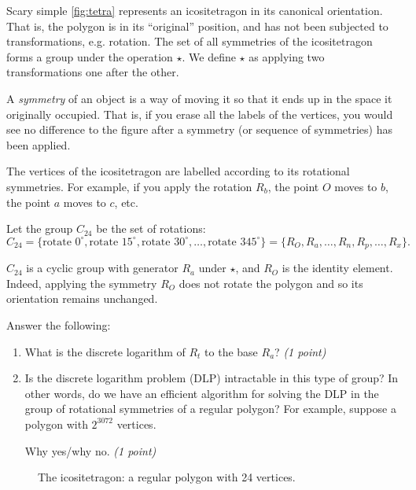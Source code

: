 \documentclass{homework}
\newcounter{ccount}
\def\nodeRot{0}
\newcommand*\poly[2][]{%
  \path (0,0) coordinate (C) [rotate/.append code={\def\nodeRot{##1}},#1]
  ++ ({angleForPoly(0,#2,0)}:x_radius and y_radius) coordinate[d] (c)
   \foreach \cnt[count=\Cnt from 0] in {1,...,#2} {
      (c) [late options={alias=c'}] (C)
      coordinate[d] (c) at ({angleForPoly(\cnt,#2,0)}:x_radius and y_radius)
      (c') edge[dashed] (c)
      \ifnum\Cnt>0 node[anchor={angleForPoly(\Cnt,#2,180+\nodeRot)},circle]
        {
          \setcounter{ccount}{\Cnt}
          \ifnum\Cnt>14\addtocounter{ccount}{1}\fi
          $\alph{ccount}$
        } \fi
   };}
\newcommand*{\polyname}{icositetragon}
\newcommand*{\polysides}{24}
\begin{document}
\begin{task}{Scary simple}
  \autoref{fig:tetra} represents an \polyname{} in its canonical orientation.
  That is, the polygon is in its \enquote{original} position, and has not been subjected to transformations, e.g. rotation.
  The set of all symmetries of the \polyname{} forms a group under the operation $\star$.
  We define $\star$ as applying two transformations one after the other.

  A \emph{symmetry} of an object is a way of moving it so that it ends up in the space it originally occupied.
  That is, if you erase all the labels of the vertices, you would see no difference to the figure after a symmetry (or sequence of symmetries) has been applied.

  The vertices of the \polyname{} are labelled according to its rotational symmetries.
  For example, if you apply the rotation $R_b$, the point $O$ moves to $b$, the point $a$ moves to $c$, etc.

  Let the group $C_{\polysides}$ be the set of rotations:
  \[
    C_{\polysides} = \{
      \text{rotate } 0^{\circ},
      \text{rotate } 15^{\circ},
      \text{rotate } 30^{\circ},
      \dots,
      \text{rotate } 345^{\circ}
    \} = \bigl\{R_O, R_a, \dots, R_n, R_p, \dots, R_x\bigr\}.
  \]

  $C_{\polysides}$ is a cyclic group with generator $R_a$ under $\star$, and $R_O$ is the identity element.
  Indeed, applying the symmetry $R_O$ does not rotate the polygon and so its orientation remains unchanged.

  Answer the following:
  \begin{enumerate}
    \item What is the discrete logarithm of $R_t$ to the base $R_a$? \textit{(1 point)}
    \item Is the discrete logarithm problem (DLP) intractable in this type of group?
    In other words, do we have an efficient algorithm for solving the DLP in the group of rotational symmetries of a regular polygon?
    For example, suppose a polygon with $2^{3072}$ vertices.

    Why yes/why no.
    \textit{(1 point)}
  \end{enumerate}

  \begin{figure}[h]
    \centering
    \caption{The \polyname{}: a regular polygon with \polysides{} vertices.}
    \label{fig:tetra}
  \end{figure}
\end{task}
\end{document}
